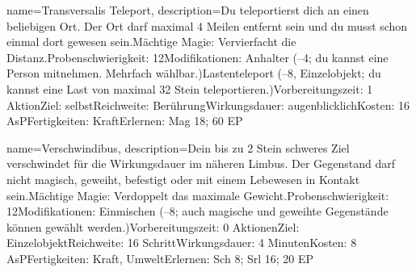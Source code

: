 {
    name={Transversalis Teleport},
    description={Du teleportierst dich an einen beliebigen Ort. Der Ort darf maximal 4 Meilen entfernt sein und du musst schon einmal dort gewesen sein.\newline Mächtige Magie: Vervierfacht die Distanz.\newline Probenschwierigkeit: 12\newline Modifikationen: Anhalter (–4; du kannst eine Person mitnehmen. Mehrfach wählbar.)\newline Lastenteleport (–8, Einzelobjekt; du kannst eine Last von maximal 32 Stein teleportieren.)\newline Vorbereitungszeit: 1 Aktion\newline Ziel: selbst\newline Reichweite: Berührung\newline Wirkungsdauer: augenblicklich\newline Kosten: 16 AsP\newline Fertigkeiten: Kraft\newline Erlernen: Mag 18; 60 EP}
}


{
    name={Verschwindibus},
    description={Dein bis zu 2 Stein schweres Ziel verschwindet für die Wirkungsdauer im näheren Limbus. Der Gegenstand darf nicht magisch, geweiht, befestigt oder mit einem Lebewesen in Kontakt sein.\newline Mächtige Magie: Verdoppelt das maximale Gewicht.\newline Probenschwierigkeit: 12\newline Modifikationen: Einmischen (–8; auch magische und geweihte Gegenstände können gewählt werden.)\newline Vorbereitungszeit: 0 Aktionen\newline Ziel: Einzelobjekt\newline Reichweite: 16 Schritt\newline Wirkungsdauer: 4 Minuten\newline Kosten: 8 AsP\newline Fertigkeiten: Kraft, Umwelt\newline Erlernen: Sch 8; Srl 16; 20 EP}
}


